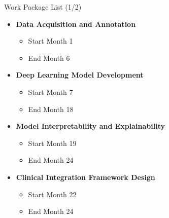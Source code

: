 \documentclass{beamer}
\begin{document}
\begin{frame}{Work Package List (1/2)}
  \begin{itemize}
    \item \textbf{Data Acquisition and Annotation}
          \begin{itemize}
            \item Start Month 1
            \item End Month 6
          \end{itemize}

    \item \textbf{Deep Learning Model Development}
          \begin{itemize}
            \item Start Month 7
            \item End Month 18
          \end{itemize}

    \item \textbf{Model Interpretability and Explainability}
          \begin{itemize}
            \item Start Month 19
            \item End Month 24
          \end{itemize}

    \item \textbf{Clinical Integration Framework Design}
          \begin{itemize}
            \item Start Month 22
            \item End Month 24
          \end{itemize}
  \end{itemize}
\end{frame}
\end{document}
